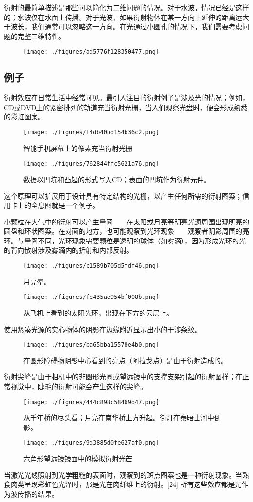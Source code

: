 衍射的最简单描述是那些可以简化为二维问题的情况。对于水波，情况已经是这样的；水波仅在水面上传播。对于光波，如果衍射物体在某一方向上延伸的距离远大于波长，我们通常可以忽略这一方向。在光通过小圆孔的情况下，我们需要考虑问题的完整三维特性。
\begin{figure}[ht]
\centering
\texttt{[image: ./figures/ad5776f128350477.png]}
\caption{} \label{fig_YS_6}
\end{figure}
\subsection{例子}
衍射效应在日常生活中经常可见。最引人注目的衍射例子是涉及光的情况；例如，CD或DVD上的紧密排列的轨道充当衍射光栅，当人们观察光盘时，便会形成熟悉的彩虹图案。
\begin{figure}[ht]
\centering
\texttt{[image: ./figures/f4db40bd154b36c2.png]}
\caption{智能手机屏幕上的像素充当衍射光栅} \label{fig_YS_7}
\end{figure}
\begin{figure}[ht]
\centering
\texttt{[image: ./figures/762844ffc5621a76.png]}
\caption{数据以凹坑和凸起的形式写入CD；表面的凹坑作为衍射元件。} \label{fig_YS_8}
\end{figure}
这个原理可以扩展用于设计具有特定结构的光栅，以产生任何所需的衍射图案；信用卡上的全息图就是一个例子。

小颗粒在大气中的衍射可以产生晕圈——在太阳或月亮等明亮光源周围出现明亮的圆盘和环状图案。在对面的地方，也可能观察到光环现象——观察者阴影周围的亮环。与晕圈不同，光环现象需要颗粒是透明的球体（如雾滴），因为形成光环的光的背向散射涉及雾滴内的折射和内部反射。
\begin{figure}[ht]
\centering
\texttt{[image: ./figures/c1589b705d5fdf46.png]}
\caption{月亮晕。} \label{fig_YS_9}
\end{figure}
\begin{figure}[ht]
\centering
\texttt{[image: ./figures/fe435ae954bf008b.png]}
\caption{从飞机上看到的太阳光环，出现在下方的云层上。} \label{fig_YS_11}
\end{figure}
使用紧凑光源的实心物体的阴影在边缘附近显示出小的干涉条纹。
\begin{figure}[ht]
\centering
\texttt{[image: ./figures/ba65bba15578e4b0.png]}
\caption{在圆形障碍物阴影中心看到的亮点（阿拉戈点）是由于衍射造成的。} \label{fig_YS_10}
\end{figure}
衍射尖峰是由于相机中的非圆形光圈或望远镜中的支撑支架引起的衍射图样；在正常视觉中，睫毛的衍射可能会产生这样的尖峰。
\begin{figure}[ht]
\centering
\texttt{[image: ./figures/444c898c58469d47.png]}
\caption{从千年桥的尽头看；月亮在南华桥上方升起。街灯在泰晤士河中倒影。} \label{fig_YS_12}
\end{figure}
\begin{figure}[ht]
\centering
\texttt{[image: ./figures/9d3885d0fe627af0.png]}
\caption{六角形望远镜镜面中的模拟衍射光芒} \label{fig_YS_13}
\end{figure}
当激光光线照射到光学粗糙的表面时，观察到的斑点图案也是一种衍射现象。当熟食肉类呈现彩虹色光泽时，那是光在肉纤维上的衍射。[24] 所有这些效应都是光作为波传播的结果。


